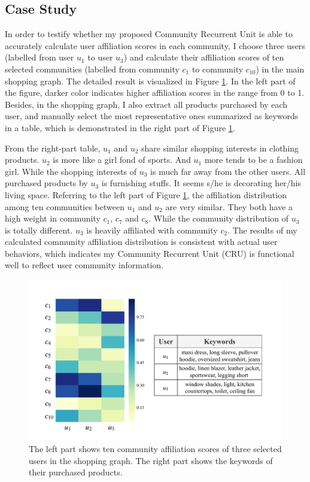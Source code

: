 \subsection{Case Study}

In order to testify whether my proposed Community Recurrent Unit is able to accurately calculate user affiliation scores in each community, I choose three users (labelled from user $u_1$ to user $u_3$) and calculate their affiliation scores of ten selected communities (labelled from community $c_1$ to community $c_{10}$) in the main shopping graph. The detailed result is visualized in Figure \ref{fig:case}. In the left part of the figure, darker color indicates higher affiliation scores in the range from 0 to 1. Besides, in the shopping graph, I also extract all products purchased by each user, and manually select the most representative ones summarized as keywords in a table, which is demonstrated in the right part of Figure \ref{fig:case}.

From the right-part table, $u_1$ and $u_2$ share similar shopping interests in clothing products. $u_2$ is more like a girl fond of sports. And $u_1$ more tends to be a fashion girl. While the shopping interests of $u_3$ is much far away from the other users. All purchased products by $u_3$ is furnishing stuffs. It seems s/he is decorating her/his living space. Referring to the left part of Figure \ref{fig:case}, the affiliation distribution among ten communities between $u_1$ and $u_2$ are very similar. They both have a high weight in community $c_1$, $c_7$ and $c_8$. While the community distribution of $u_3$ is totally different. $u_3$ is heavily affiliated with community $c_2$. The results of my calculated community affiliation distribution is consistent with actual user behaviors, which indicates my Community Recurrent Unit (CRU) is  functional well to reflect user community information.
\begin{figure}  
	\centering
	\includegraphics[width=1\columnwidth]{img/chapter4/case.pdf}
	\caption{The left part shows ten community affiliation scores of three selected users in the shopping graph. The right part shows the keywords of their purchased products.}
	
	\label{fig:case}
\end{figure}

